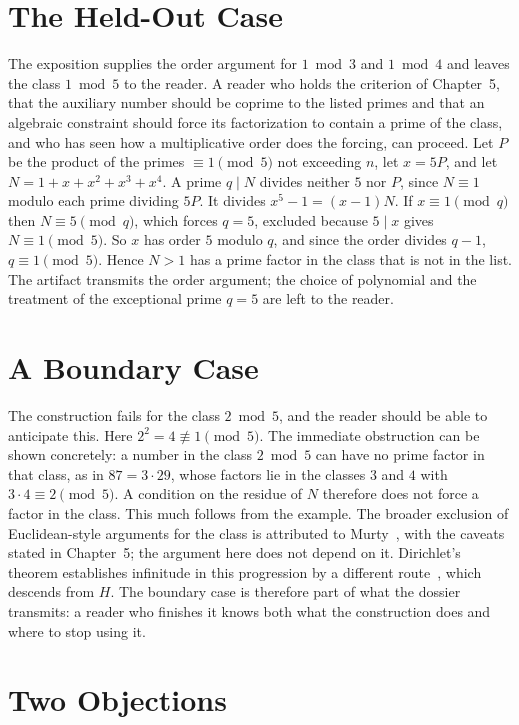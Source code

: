 \documentclass[11pt]{book}
\theoremstyle{definition}
\theoremstyle{remark}
\begin{document}
\section{The Held-Out Case}

The exposition supplies the order argument for $1\bmod3$ and $1\bmod4$ and leaves the class $1\bmod5$ to the reader. A reader who holds the criterion of Chapter~5, that the auxiliary number should be coprime to the listed primes and that an algebraic constraint should force its factorization to contain a prime of the class, and who has seen how a multiplicative order does the forcing, can proceed. Let $P$ be the product of the primes $\equiv1\pmod 5$ not exceeding $n$, let $x=5P$, and let $N=1+x+x^2+x^3+x^4$. A prime $q\mid N$ divides neither $5$ nor $P$, since $N\equiv1$ modulo each prime dividing $5P$. It divides $x^5-1=(x-1)N$. If $x\equiv1\pmod q$ then $N\equiv5\pmod q$, which forces $q=5$, excluded because $5\mid x$ gives $N\equiv1\pmod5$. So $x$ has order $5$ modulo $q$, and since the order divides $q-1$, $q\equiv1\pmod5$. Hence $N>1$ has a prime factor in the class that is not in the list. The artifact transmits the order argument; the choice of polynomial and the treatment of the exceptional prime $q=5$ are left to the reader.

\section{A Boundary Case}

The construction fails for the class $2\bmod 5$, and the reader should be able to anticipate this. Here $2^2=4\not\equiv1\pmod5$. The immediate obstruction can be shown concretely: a number in the class $2\bmod5$ can have no prime factor in that class, as in $87=3\cdot29$, whose factors lie in the classes $3$ and $4$ with $3\cdot4\equiv2\pmod5$. A condition on the residue of $N$ therefore does not force a factor in the class. This much follows from the example. The broader exclusion of Euclidean-style arguments for the class is attributed to Murty~\cite{murty}, with the caveats stated in Chapter~5; the argument here does not depend on it. Dirichlet's theorem establishes infinitude in this progression by a different route~\cite{dirichlet}, which descends from $H$. The boundary case is therefore part of what the dossier transmits: a reader who finishes it knows both what the construction does and where to stop using it.

\section{Two Objections}
\end{document}

